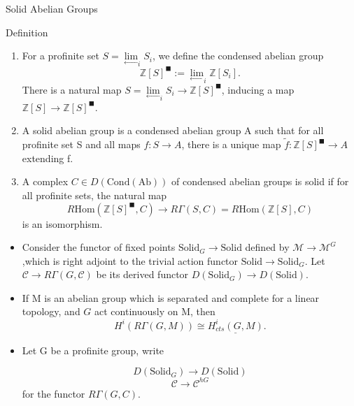 \documentclass[aspectratio=1610]{ctexbeamer}
\def  \Ab       {\mathrm{Ab}}
\def  \Hom      {\mathrm{Hom}}
\def  \leftlim  {\underset{\longleftarrow}{\lim}}
\def  \Solid    {\mathrm{Solid}}
\def  \cC       {\mathcal{C}}
\def  \cm       {\mathcal{M}}
\def  \bz       {\mathbb{Z}}
\begin{document}
\begin{frame}{Solid Abelian Groups}

\begin{block}{Definition}
	\begin{enumerate}
		\item For a profinite set $S= \leftlim_i S_i$, we define the condensed abelian group
		$$
		\bz[S]^{\blacksquare}:= \leftlim_i  \bz[S_i].
		$$
		There is a natural map $S= \leftlim_i S_i  \to \bz[S]^{\blacksquare}$, inducing a map $\bz[S] \to \bz[S]^{\blacksquare}$.
		\item A solid abelian group is a condensed abelian group A such that for all profinite set S and all maps $f: S \to A$, there is a unique map $\widetilde{f}: \bz[S]^{\blacksquare} \to A$ extending f.
		\item A complex  $C \in D(\mathrm{Cond}(\Ab))$ of condensed abelian groups is solid if for all profinite sets, the natural map
		$$
		R\Hom(\bz[S]^{\blacksquare},C) \to R \Gamma(S,C)= R\Hom(\bz[S], C)
		$$
		is an isomorphism.
	\end{enumerate}
\end{block}

\end{frame}



\begin{frame}
	\begin{itemize}
	
\item 	Consider the functor of fixed points $\Solid_G \to \Solid$ defined by $\cm \to \cm^G$,which is right adjoint to the trivial action functor $\Solid \to \Solid_G$.  Let $\cC \to R\Gamma(G, \cC)$ be its derived functor $D(\Solid_G) \to D(\Solid)$. 
	
	
\item 	If M is an abelian group which is separated and complete for a linear topology, and $G$ act continuously on M, then
	$$
	H^i(R\Gamma(G, M)) \cong \underline{H^i_{cts}(G, M)}.
	$$

\item  Let G be a profinite group, write

$$
D(\Solid_G) \to D(\Solid)
$$
$$
\cC \to \cC^{hG}
$$
for the functor $R\Gamma(G,C)$.
	\end{itemize}
\end{frame}
\end{document}
